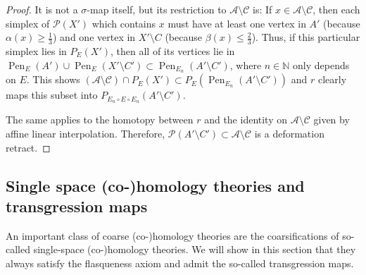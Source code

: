 \documentclass[pdftex]{sigma}
\numberwithin{equation}{section}
\theoremstyle{definition}
\newcommand{\N}{\mathbb{N}}
\newcommand{\cP}{\mathcal{P}}
\newcommand{\cA}{\mathcal{A}}
\newcommand{\cC}{\mathcal{C}}
\DeclareMathOperator{\Pen}{Pen}
\begin{document}
\begin{proof}
It is not a $\sigma$-map itself, but its restriction to $\cA\setminus\cC$ is: If $x\in\cA\setminus\cC$, then each simplex of $\cP(X')$ which contains $x$ must have at least one vertex in $A'$ \big(because $\alpha(x)\geq\frac13$\big) and one vertex in $X'\setminus C$ \big(because $\beta(x)\leq\frac23$\big). Thus, if this particular simplex lies in $P_E(X')$, then all of its vertices lie in $\Pen_E(A')\cup\Pen_E(X'\setminus C')\subset \Pen_{E_n}(A'\setminus C')$, where $n\in\N$ only depends on $E$. This shows $(\cA\setminus\cC)\cap P_E(X')\subset P_E(\Pen_{E_n}(A'\setminus C'))$ and $r$ clearly maps this subset into $P_{E_n\circ E\circ E_n}(A'\setminus C')$.

The same applies to the homotopy between $r$ and the identity on $\cA\setminus\cC$ given by affine linear interpolation. Therefore, $\cP(A'\setminus C')\subset \cA\setminus \cC$ is a deformation retract.
\end{proof}

\subsection{Single space (co-)homology theories and transgression maps}
\label{sec:SteenrodTransgression}

An important class of coarse \mbox{(co-)}homology theories are the coarsifications of so-called single-space \mbox{(co-)}homology theories. We will show in this section that they always satisfy the flasqueness axiom and admit the so-called transgression maps.
\end{document}
